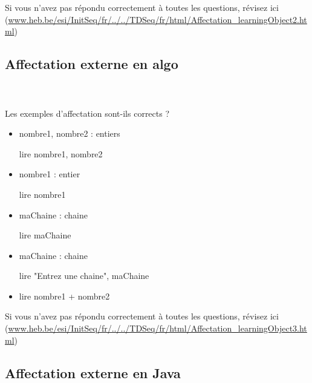 \documentclass[11pt,a4paper]{article}
\begin{document}
        Si vous n'avez pas r\'epondu correctement \`a toutes les questions, 
        r\'evisez ici (\url{www.heb.be/esi/InitSeq/fr/../../TDSeq/fr/html/Affectation\_learningObject2.html})
            \par
        \subsection{Affectation externe en algo}
			
		\subparagraph{} 
		
                \textcolor{white}{.} \par
            Les exemples d'affectation sont-ils corrects ?
						
            \begin{itemize} 
        
            \item[ \ding{"6F} ] nombre1, nombre2 : entiers \par
				
						lire nombre1, nombre2
        
            \item[ \ding{"6F} ] nombre1 : entier \par
				
						lire nombre1
        
            \item[ \ding{"6F} ] maChaine : chaine \par
				
						lire maChaine
        
            \item[ \ding{"6F} ] maChaine : chaine \par
				
						lire "Entrez une chaine", maChaine
        
            \item[ \ding{"6F} ] lire nombre1 + nombre2
        
            \end{itemize} 
        Si vous n'avez pas r\'epondu correctement \`a toutes les questions, 
        r\'evisez ici (\url{www.heb.be/esi/InitSeq/fr/../../TDSeq/fr/html/Affectation\_learningObject3.html})
            \par
        \subsection{Affectation externe en Java}
			
\end{document}
